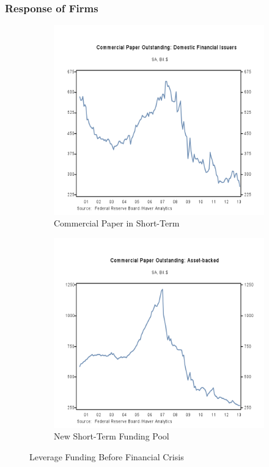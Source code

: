 \pagebreak
\subsubsection{Response of Firms}

\begin{figure}[H]
\centering
\begin{subfigure}{.5\textwidth}
  \centering
  \includegraphics[width=1.0\linewidth]{figure/DomesticFinancial_CommPaper.png}
  \caption{Commercial Paper in Short-Term}
   \label{fig:FinComm}
\end{subfigure}%
\begin{subfigure}{.5\textwidth}
  \centering
  \includegraphics[width=1.0\linewidth]{figure/CommPaperOut_AssetBacked.png}
  \caption{New Short-Term Funding Pool }
  \label{fig:FinABS}
\end{subfigure}
\caption{Leverage Funding Before Financial Crisis}
\label{fig:LeverageFinance}
\end{figure}

